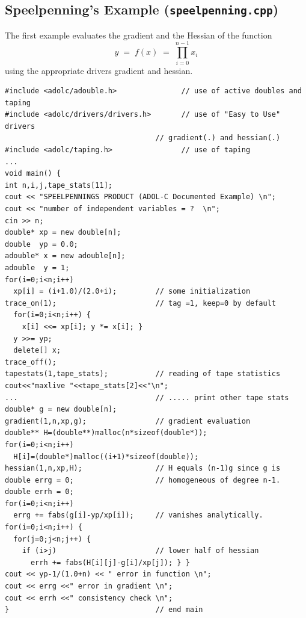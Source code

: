 \documentclass[11pt,twoside]{article}
\begin{document}
\subsection{Speelpenning's Example ({\tt speelpenning.cpp})}
%
The first example evaluates the gradient and the Hessian of
the function
\[ 
y \; = \; f(x)\; =\; \prod_{i=0}^{n-1} x_i 
\] 
using the appropriate drivers {\sf gradient} and {\sf hessian}.

\begin{verbatim}
#include <adolc/adouble.h>               // use of active doubles and taping
#include <adolc/drivers/drivers.h>       // use of "Easy to Use" drivers 
                                   // gradient(.) and hessian(.)
#include <adolc/taping.h>                // use of taping
...
void main() {
int n,i,j,tape_stats[11];
cout << "SPEELPENNINGS PRODUCT (ADOL-C Documented Example) \n";
cout << "number of independent variables = ?  \n";
cin >> n;
double* xp = new double[n];          
double  yp = 0.0;
adouble* x = new adouble[n];      
adouble  y = 1;
for(i=0;i<n;i++)
  xp[i] = (i+1.0)/(2.0+i);         // some initialization
trace_on(1);                       // tag =1, keep=0 by default
  for(i=0;i<n;i++) {
    x[i] <<= xp[i]; y *= x[i]; }      
  y >>= yp;
  delete[] x;                      
trace_off();
tapestats(1,tape_stats);           // reading of tape statistics
cout<<"maxlive "<<tape_stats[2]<<"\n";
...                                // ..... print other tape stats
double* g = new double[n];        
gradient(1,n,xp,g);                // gradient evaluation
double** H=(double**)malloc(n*sizeof(double*));
for(i=0;i<n;i++)
  H[i]=(double*)malloc((i+1)*sizeof(double)); 
hessian(1,n,xp,H);                 // H equals (n-1)g since g is
double errg = 0;                   // homogeneous of degree n-1.
double errh = 0;
for(i=0;i<n;i++)
  errg += fabs(g[i]-yp/xp[i]);     // vanishes analytically.
for(i=0;i<n;i++) {
  for(j=0;j<n;j++) {
    if (i>j)                       // lower half of hessian
      errh += fabs(H[i][j]-g[i]/xp[j]); } }
cout << yp-1/(1.0+n) << " error in function \n";
cout << errg <<" error in gradient \n";
cout << errh <<" consistency check \n";
}                                  // end main
\end{verbatim}
%
\end{document}
